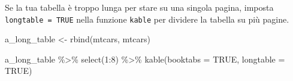 \documentclass[a4paper, 11pt, nobind]{templates/ociamthesis}
\newenvironment{Shaded}{\begin{snugshade}}{\end{snugshade}}
\newcommand{\AttributeTok}[1]{\textcolor[rgb]{0.77,0.63,0.00}{#1}}
\newcommand{\ConstantTok}[1]{\textcolor[rgb]{0.00,0.00,0.00}{#1}}
\newcommand{\DecValTok}[1]{\textcolor[rgb]{0.00,0.00,0.81}{#1}}
\newcommand{\FunctionTok}[1]{\textcolor[rgb]{0.00,0.00,0.00}{#1}}
\newcommand{\NormalTok}[1]{#1}
\newcommand{\OtherTok}[1]{\textcolor[rgb]{0.56,0.35,0.01}{#1}}
\newcommand{\SpecialCharTok}[1]{\textcolor[rgb]{0.00,0.00,0.00}{#1}}
\renewenvironment{Shaded}
{
  \vspace{10pt}%
  \begin{snugshade}%
}{%
  \end{snugshade}%
  \vspace{8pt}%
}
\begin{document}
Se la tua tabella è troppo lunga per stare su una singola pagina, imposta \texttt{longtable\ =\ TRUE} nella funzione \texttt{kable} per dividere la tabella su più pagine.

\begin{Shaded}
\begin{Highlighting}[]
\NormalTok{a\_long\_table }\OtherTok{\textless{}{-}} \FunctionTok{rbind}\NormalTok{(mtcars, mtcars)}

\NormalTok{a\_long\_table }\SpecialCharTok{\%\textgreater{}\%} 
  \FunctionTok{select}\NormalTok{(}\DecValTok{1}\SpecialCharTok{:}\DecValTok{8}\NormalTok{) }\SpecialCharTok{\%\textgreater{}\%} 
  \FunctionTok{kable}\NormalTok{(}\AttributeTok{booktabs =} \ConstantTok{TRUE}\NormalTok{, }\AttributeTok{longtable =} \ConstantTok{TRUE}\NormalTok{)}
\end{Highlighting}
\end{Shaded}
\end{document}
